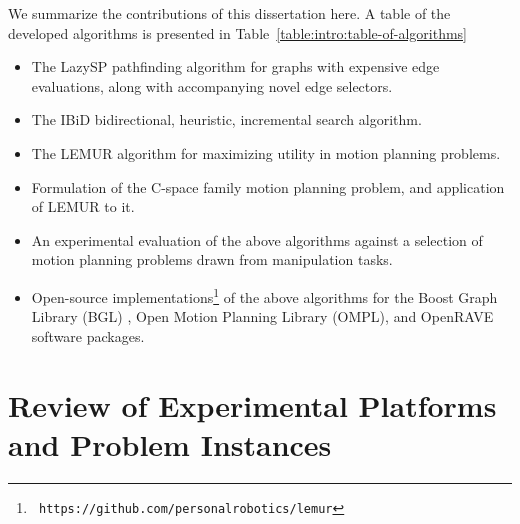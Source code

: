 We summarize the contributions of this dissertation here.
A table of the developed algorithms is presented in
Table~\ref{table:intro:table-of-algorithms}

\begin{itemize}
\item The LazySP pathfinding algorithm for graphs with expensive
   edge evaluations,
   along with accompanying novel edge selectors.
\item The IBiD bidirectional, heuristic, incremental search algorithm.
\item The LEMUR algorithm for maximizing utility
   in motion planning problems.
\item Formulation of the C-space family motion planning problem,
   and application of LEMUR to it.
\item An experimental evaluation of the above algorithms against a
   selection of motion planning problems drawn from manipulation tasks.
\item Open-source implementations\footnote[][1cm]{\texttt{%
   https://github.com/personalrobotics/lemur}%
   }
   of the above algorithms for the
   Boost Graph Library (BGL) \citep{siek2001boostgraph},
   Open Motion Planning Library (OMPL), \citep{sucan2012ompl}
   and OpenRAVE \citep{diankov2010openrave} software packages.
\end{itemize}



\section{Review of Experimental Platforms and Problem Instances}

